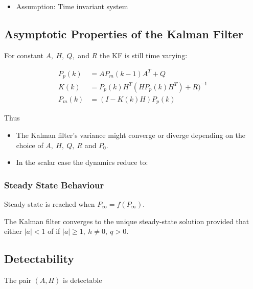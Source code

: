 \documentclass[10pt,a4paper]{scrartcl}
\begin{document}
\begin{multicols*}{2}
\begin{multicols*}{3}
\begin{itemize}
\item Assumption: Time invariant system

\end{itemize}

\subsection{Asymptotic Properties of the Kalman Filter}

For constant $A,\ H,\ Q,$ and $R$ the KF is still time varying:

\begin{align*}
P_p(k)&=AP_m(k-1)A^T+Q\\
K(k)&=P_p(k)H^T(HP_p(k)H^T)+R)^{-1}\\
P_m(k)&=(I-K(k)H)P_p(k)
\end{align*}

Thus


\begin{itemize}
\item The Kalman filter's variance might converge or diverge depending on the choice of $A,\ H,\ Q,\ R$ and $P_0$.
\item In the scalar case the dynamics reduce to:

\end{itemize}

\subsubsection{Steady State Behaviour}

Steady state is reached when $P_\infty = f(P_\infty)$.

The Kalman filter converges to the unique steady-state solution provided that either $|a|<1$ of if $|a|\geq 1,\ h\neq 0,\ q>0$.

\subsection{Detectability}

The pair $(A,H)$ is detectable


\end{multicols*}
\end{multicols*}
\end{document}
